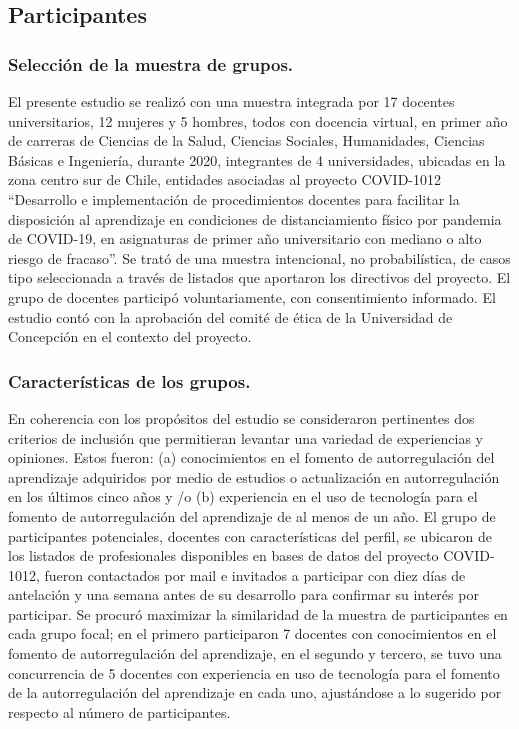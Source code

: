 \documentclass[spanish]{textolivre}
\begin{document}
\subsection{Participantes}
\subsubsection{Selección de la muestra de grupos.}
El presente estudio se realizó con una muestra integrada por 17 docentes universitarios, 12 mujeres y 5 hombres,  todos  con docencia virtual, en primer año de carreras de Ciencias de la Salud, Ciencias Sociales, Humanidades, Ciencias Básicas e Ingeniería, durante 2020, integrantes de 4 universidades, ubicadas en la zona centro sur de Chile, entidades asociadas al proyecto COVID-1012 “Desarrollo e implementación de procedimientos docentes para facilitar la disposición al aprendizaje en condiciones de distanciamiento físico por pandemia de COVID-19, en asignaturas de primer año universitario con mediano o alto riesgo de fracaso”. Se trató de una muestra intencional, no probabilística, de casos tipo \cite{hernandez2018} seleccionada a través de listados que aportaron los directivos del proyecto. El grupo de docentes participó voluntariamente, con consentimiento informado. El estudio contó con la aprobación del comité de ética de la Universidad de Concepción en el contexto del proyecto. 

\subsubsection{Características de los grupos.}
En coherencia con los propósitos del estudio se consideraron pertinentes dos criterios de inclusión que permitieran levantar una variedad de experiencias y opiniones. Estos fueron: (a) conocimientos en el fomento de autorregulación del aprendizaje adquiridos por medio de estudios o actualización en autorregulación en los últimos cinco años y /o (b) experiencia en el uso de tecnología para el fomento de autorregulación del aprendizaje de al menos de un año. El grupo de participantes potenciales, docentes con características del perfil, se ubicaron de los listados de profesionales disponibles en bases de datos del proyecto COVID-1012, fueron contactados por mail  e invitados a participar con diez días de antelación y una semana antes de su desarrollo para confirmar su interés por participar. Se procuró maximizar la similaridad de la muestra de participantes en cada grupo focal; en el primero participaron 7 docentes con conocimientos en el fomento de autorregulación del aprendizaje, en el segundo y tercero, se tuvo una concurrencia de 5 docentes con experiencia en uso de tecnología para el fomento de la autorregulación del aprendizaje en cada uno, ajustándose a lo sugerido por \textcite{krueger2006} respecto al número de participantes.
\end{document}
